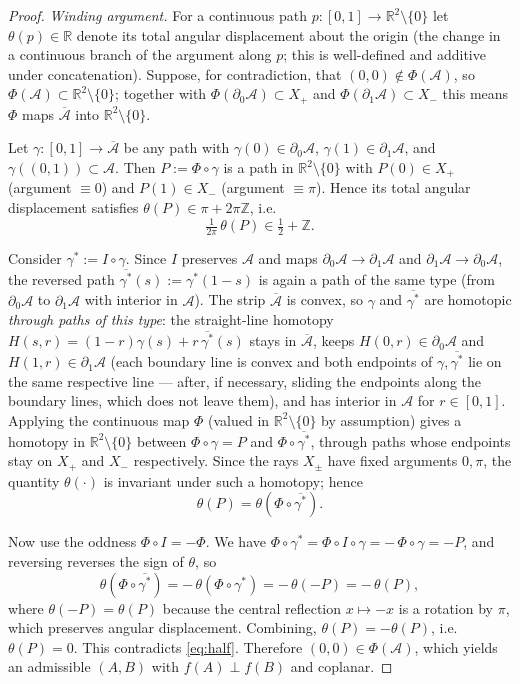 \documentclass[12pt]{article}
\newcommand{\R}{\mathbb{R}}
\newcommand{\Z}{\mathbb{Z}}
\begin{document}
\begin{proof}
\emph{Winding argument.} For a continuous path
$p:[0,1]\to\R^2\setminus\{0\}$ let $\theta(p)\in\R$ denote its total
angular displacement about the origin (the change in a continuous branch
of the argument along $p$; this is well-defined and additive under
concatenation). Suppose, for contradiction, that
$(0,0)\notin\Phi(\mathcal A)$, so $\Phi(\mathcal A)\subset\R^2\setminus
\{0\}$; together with $\Phi(\partial_0\mathcal A)\subset X_+$ and
$\Phi(\partial_1\mathcal A)\subset X_-$ this means $\Phi$ maps
$\overline{\mathcal A}$ into $\R^2\setminus\{0\}$.

Let $\gamma:[0,1]\to\overline{\mathcal A}$ be any path with
$\gamma(0)\in\partial_0\mathcal A$, $\gamma(1)\in\partial_1\mathcal A$,
and $\gamma((0,1))\subset\mathcal A$. Then $P:=\Phi\circ\gamma$ is a path
in $\R^2\setminus\{0\}$ with $P(0)\in X_+$ (argument $\equiv 0$) and
$P(1)\in X_-$ (argument $\equiv\pi$). Hence its total angular
displacement satisfies $\theta(P)\in\pi+2\pi\Z$, i.e.
\begin{equation}\label{eq:half}
\tfrac{1}{2\pi}\,\theta(P)\in\tfrac12+\Z .
\end{equation}

Consider $\gamma^*:=I\circ\gamma$. Since $I$ preserves $\mathcal A$ and
maps $\partial_0\mathcal A\to\partial_1\mathcal A$ and
$\partial_1\mathcal A\to\partial_0\mathcal A$, the reversed path
$\overline{\gamma^*}(s):=\gamma^*(1-s)$ is again a path of the same type
(from $\partial_0\mathcal A$ to $\partial_1\mathcal A$ with interior in
$\mathcal A$). The strip $\overline{\mathcal A}$ is convex, so $\gamma$
and $\overline{\gamma^*}$ are homotopic \emph{through paths of this type}:
the straight-line homotopy
$H(s,r)=(1-r)\gamma(s)+r\,\overline{\gamma^*}(s)$ stays in
$\overline{\mathcal A}$, keeps $H(0,r)\in\partial_0\mathcal A$ and
$H(1,r)\in\partial_1\mathcal A$ (each boundary line is convex and both
endpoints of $\gamma,\overline{\gamma^*}$ lie on the same respective
line — after, if necessary, sliding the endpoints along the boundary
lines, which does not leave them), and has interior in $\mathcal A$ for
$r\in[0,1]$. Applying the continuous map $\Phi$ (valued in
$\R^2\setminus\{0\}$ by assumption) gives a homotopy in
$\R^2\setminus\{0\}$ between $\Phi\circ\gamma=P$ and
$\Phi\circ\overline{\gamma^*}$, through paths whose endpoints stay on
$X_+$ and $X_-$ respectively. Since the rays $X_\pm$ have fixed arguments
$0,\pi$, the quantity $\theta(\cdot)$ is invariant under such a homotopy;
hence
\[
\theta(P)=\theta(\Phi\circ\overline{\gamma^*}).
\]

Now use the oddness $\Phi\circ I=-\Phi$. We have
$\Phi\circ\gamma^*=\Phi\circ I\circ\gamma=-\,\Phi\circ\gamma=-P$, and
reversing reverses the sign of $\theta$, so
\[
\theta(\Phi\circ\overline{\gamma^*})
=-\,\theta(\Phi\circ\gamma^*)
=-\,\theta(-P)
=-\,\theta(P),
\]
where $\theta(-P)=\theta(P)$ because the central reflection $x\mapsto -x$
is a rotation by $\pi$, which preserves angular displacement. Combining,
$\theta(P)=-\theta(P)$, i.e.\ $\theta(P)=0$. This contradicts
\eqref{eq:half}. Therefore $(0,0)\in\Phi(\mathcal A)$, which yields an
admissible $(A,B)$ with $f(A)\perp f(B)$ and coplanar.
\end{proof}
\end{document}
